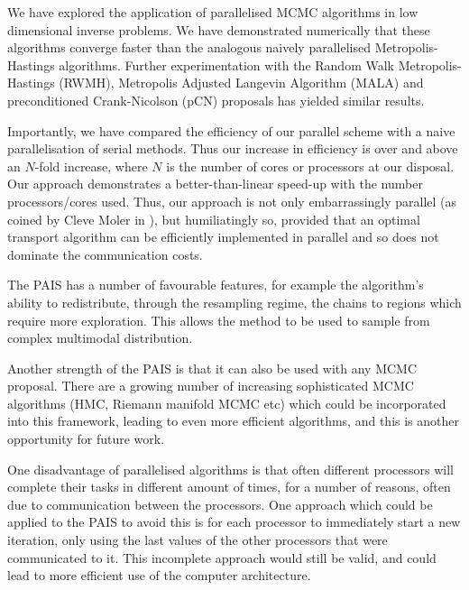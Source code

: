 \documentclass[final]{siamltex}
\begin{document}
We have explored the application of parallelised MCMC algorithms in
low dimensional inverse problems. We have demonstrated numerically
that these algorithms converge faster than the analogous naively parallelised
Metropolis-Hastings algorithms. Further experimentation with the
Random Walk Metropolis-Hastings (RWMH), Metropolis Adjusted Langevin
Algorithm (MALA) and preconditioned Crank-Nicolson (pCN) proposals has
yielded similar results\cite{Paul}.%

Importantly, we have compared the efficiency of our parallel scheme
with a naive parallelisation of serial methods. Thus our increase in
efficiency is over and above an $N$-fold increase, where $N$ is the
number of cores or processors at our disposal. Our approach
demonstrates a better-than-linear speed-up with the number
processors/cores used. Thus, our approach is not only embarrassingly
parallel (as coined by Cleve Moler in \cite{moler1986matrix}), but
humiliatingly so, provided that an optimal transport algorithm can be
efficiently implemented in parallel and so does not dominate the
communication costs.

The PAIS has a number of favourable features, for example the
algorithm's ability to redistribute, through the resampling regime,
the chains to regions which require more exploration. This allows the
method to be used to sample from complex multimodal distribution.

Another strength of the PAIS is that it can also be used with any MCMC
proposal. There are a growing number of increasing sophisticated MCMC
algorithms (HMC, Riemann manifold MCMC etc) which could be
incorporated into this framework, leading to even more efficient
algorithms, and this is another opportunity for future work. 

One disadvantage of parallelised algorithms is that often different
processors will complete their tasks in different amount of times, for
a number of reasons, often due to communication between the
processors. One approach which could be applied to the PAIS to avoid
this is for each processor to immediately start a new iteration, only
using the last values of the other processors that were communicated
to it. This incomplete approach would still be valid, and could lead
to more efficient use of the computer architecture.
\end{document}
